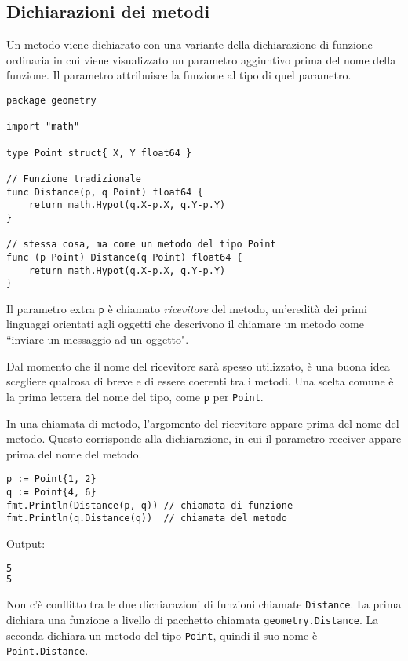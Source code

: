 \documentclass[../../thesis.tex]{subfiles}
\begin{document}
    \subsection{Dichiarazioni dei metodi}\label{subsec:dichiarazioni-dei-metodi}
    Un metodo viene dichiarato con una variante della dichiarazione di funzione ordinaria in cui viene visualizzato un parametro aggiuntivo prima del nome della funzione.
    Il parametro attribuisce la funzione al tipo di quel parametro.
    \begin{lstlisting}[frame = single, label = {lst:lstlisting5-1.1}]
package geometry

import "math"

type Point struct{ X, Y float64 }

// Funzione tradizionale
func Distance(p, q Point) float64 {
    return math.Hypot(q.X-p.X, q.Y-p.Y)
}

// stessa cosa, ma come un metodo del tipo Point
func (p Point) Distance(q Point) float64 {
    return math.Hypot(q.X-p.X, q.Y-p.Y)
}
    \end{lstlisting}
    Il parametro extra \verb"p" è chiamato \textit{ricevitore} del metodo, un'eredità dei primi linguaggi orientati agli oggetti che descrivono il chiamare un metodo come ``inviare un messaggio ad un oggetto".
    \hfill \vspace{12pt}

    Dal momento che il nome del ricevitore sarà spesso utilizzato, è una buona idea scegliere qualcosa di breve e di essere coerenti tra i metodi.
    Una scelta comune è la prima lettera del nome del tipo, come \verb"p" per \verb"Point".
    \hfill \vspace{12pt}

    In una chiamata di metodo, l'argomento del ricevitore appare prima del nome del metodo.
    Questo corrisponde alla dichiarazione, in cui il parametro receiver appare prima del nome del metodo.
    \begin{lstlisting}[frame = single, label = {lst:lstlisting5-1.2}]
p := Point{1, 2}
q := Point{4, 6}
fmt.Println(Distance(p, q)) // chiamata di funzione
fmt.Println(q.Distance(q))  // chiamata del metodo
    \end{lstlisting}
    Output:
    \begin{lstlisting}[language = bash, frame = L, label = {lst:lstlisting5-1.3}]
5
5
    \end{lstlisting}
    Non c'è conflitto tra le due dichiarazioni di funzioni chiamate \verb"Distance".
    La prima dichiara una funzione a livello di pacchetto chiamata \verb"geometry.Distance".
    La seconda dichiara un metodo del tipo \verb"Point", quindi il suo nome è \verb"Point.Distance".
    \hfill \vspace{12pt}
\end{document}
